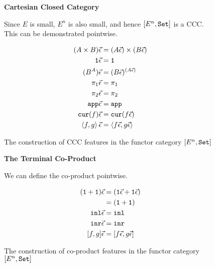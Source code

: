 \documentclass{Report}
\begin{document}
\begin{figure}
    
    \begin{framed}
        \centering\textbf{Cartesian Closed Category}

Since $E$ is small, $E^n$ is also small, and hence $[E^n, \texttt{Set}]$ is a CCC. This can be demonstrated pointwise.

\begin{align*}
    (A\times B)\vec{\epsilon} & = (A\vec{\epsilon})\times(B\vec{\epsilon})\\
    \texttt{1}\vec{\epsilon} & = \texttt{1}\\
    (B^A)\vec{\epsilon} &= (B\vec{\epsilon})^{(A\vec{\epsilon})}\\
    \pi_1\vec{\epsilon} & = \pi_1\\
    \pi_2\vec{\epsilon} & = \pi_2\\
    \texttt{app}\vec{\epsilon} & = \texttt{app}\\
    \texttt{cur}(f)\vec{\epsilon} & = \texttt{cur}(f\vec{\epsilon})\\
    \left\langle f, g\right\rangle\vec{\epsilon} & = \left\langle f\vec{\epsilon}, g\vec{\epsilon}\right\rangle\\
\end{align*}

\end{framed}
\caption{The construction of CCC features in the functor category $[E^n, \texttt{Set}]$}
\label{HowToBuildCCC}
\end{figure}

\begin{figure}
    
\begin{framed}
    \centering\textbf{The Terminal Co-Product}

We can define the co-product pointwise.

\begin{align*}
    (\texttt{1} + \texttt{1})\vec{\epsilon} & = (\texttt{1}\vec{\epsilon} + \texttt{1}\vec{\epsilon})\\
    & = (\texttt{1} + \texttt{1})\\
    \texttt{inl}\vec{\epsilon} &= \texttt{inl}\\
    \texttt{inr}\vec{\epsilon} &= \texttt{inr}\\
    [f, g]\vec{\epsilon} &= [f\vec{\epsilon}, g\vec{\epsilon}]\\
\end{align*}
\end{framed}
\caption{The construction of co-product features in the functor category $[E^n, \texttt{Set}]$}
\label{HowToBuildCoproduct}
\end{figure}
\end{document}
